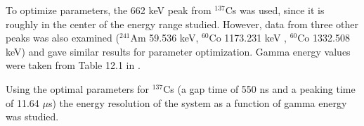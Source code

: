 To optimize parameters, the 662 keV peak from $^{137}$Cs was used, since it is roughly in the center of the energy range studied. However, data from three other peaks was also examined (${}^{241}$Am 59.536 keV, ${}^{60}$Co 1173.231 keV , ${}^{60}$Co 1332.508 keV) and gave similar results for parameter optimization. Gamma energy values were taken from Table 12.1 in \cite{Knoll} .

Using the optimal parameters for $^{137}$Cs (a gap time of 550 ns and a peaking time of 11.64 $\mu$s) the energy resolution of the system as a function of gamma energy was studied.

